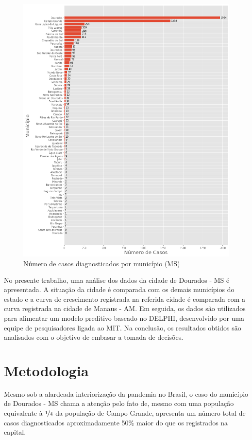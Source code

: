 \documentclass[12pt]{article}
\begin{document}
\begin{figure}[!htb]
  \centering
  \includegraphics[width=1\textwidth]{figs/casos_por_municipio.png}
  \caption{Número de casos diagnosticados por município (MS)}
  \label{fig:casosMuni}
  \end{figure}

No presente trabalho, uma análise dos dados da cidade de Dourados - MS é apresentada. A situação da cidade é comparada com os demais municípios do estado e a curva de crescimento registrada na referida cidade é comparada com a curva registrada na cidade de Manaus - AM. Em seguida, os dados são utilizados para alimentar um modelo preditivo baseado no DELPHI, desenvolvido por uma equipe de pesquisadores ligada ao MIT. Na conclusão, os resultados obtidos são analisados com o objetivo de embasar a tomada de decisões.

\section{Metodologia}\label{sec:met}

Mesmo sob a alardeada interiorização da pandemia no Brasil, o caso do município de Dourados - MS chama a atenção pelo fato de, mesmo com uma população equivalente à \(\nicefrac{1}{4}\) da população de Campo Grande, apresenta um número total de casos diagnosticados aproximadamente 50\% maior do que os registrados na capital.
\end{document}
